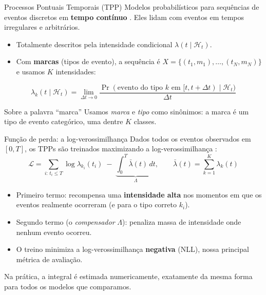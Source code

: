 \documentclass[aspectratio=169,9pt]{beamer}
\begin{document}
\begin{frame}{Processos Pontuais Temporais (TPP)}
  Modelos probabilísticos para sequências de eventos discretos em
  \textbf{tempo contínuo} \cite{zuo2020transformer}. Eles lidam com eventos em
  tempos irregulares e arbitrários.
  \vspace{0.3em}
  \begin{itemize}
    \item Totalmente descritos pela intensidade condicional $\lambda(t \mid \mathcal{H}_t)$.
    \item Com \textbf{marcas} (tipos de evento), a sequência é
          $X = \{(t_1, m_1), \ldots, (t_N, m_N)\}$ e usamos $K$ intensidades:
  \end{itemize}
  \[
    \lambda_k(t \mid \mathcal{H}_t) = \lim_{\Delta t \to 0}
    \frac{\Pr(\text{evento do tipo } k \text{ em } [t, t+\Delta t) \mid \mathcal{H}_t)}{\Delta t}
  \]
  \begin{block}{Sobre a palavra ``marca''}
    Usamos \emph{marca} e \emph{tipo} como sinônimos: a marca é um tipo de evento
    categórico, uma dentre $K$ classes.
  \end{block}
\end{frame}

\begin{frame}{Função de perda: a log-verossimilhança}
  Dados todos os eventos observados em $[0,T]$, os TPPs são treinados maximizando
  a log-verossimilhança \cite{mei2017neural}:
  \[
    \mathcal{L} = \sum_{i:\, t_i \leq T} \log \lambda_{k_i}(t_i)
      \;-\; \underbrace{\int_{0}^{T} \bar{\lambda}(t)\, dt}_{\Lambda},
    \qquad \bar{\lambda}(t) = \sum_{k=1}^{K} \lambda_k(t)
  \]
  \begin{itemize}
    \item Primeiro termo: recompensa uma \textbf{intensidade alta} nos momentos em
          que os eventos realmente ocorreram (e para o tipo correto $k_i$).
    \item Segundo termo (o \emph{compensador} $\Lambda$): penaliza massa de
          intensidade onde nenhum evento ocorreu.
    \item O treino minimiza a log-verossimilhança \textbf{negativa} (NLL), nossa
          principal métrica de avaliação.
  \end{itemize}
  Na prática, a integral é estimada numericamente, exatamente da mesma forma para
  todos os modelos que comparamos.
\end{frame}
\end{document}
